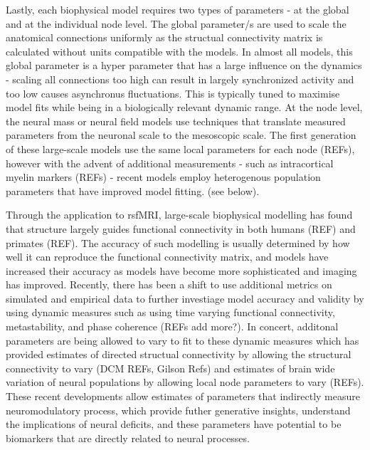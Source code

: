 \documentclass[oneside]{zHenriquesLab-StyleBioRxiv}
\begin{document}
Lastly, each biophysical model requires two types of parameters - at the global and at the individual node level. The global parameter/s are used to scale the anatomical connections uniformly as the structual connectivity matrix is calculated without units compatible with the models. In almost all models, this global parameter is a hyper parameter that has a large influence on the dynamics - scaling all connections too high can result in largely synchronized activity and too low causes asynchronus fluctuations. This is typically tuned to maximise model fits while being in a biologically relevant dynamic range. At the node level, the neural mass or neural field models use techniques that translate measured parameters from the neuronal scale to the mesoscopic scale. The first generation of these large-scale models use the same local parameters for each node (REFs), however with the advent of additional measurements - such as intracortical myelin markers (REFs) - recent models employ heterogenous population parameters that have improved model fitting. (see below).


Through the application to rsfMRI, large-scale biophysical modelling has found that structure largely guides functional connectivity in both humans (REF) and primates (REF). The accuracy of such modelling is usually determined by how well it can reproduce the functional connectivity matrix, and models have increased their accuracy as models have become more sophisticated and imaging has improved. Recently, there has been a shift to use additional metrics on simulated and empirical data to further investiage model accuracy and validity by using dynamic measures such as using time varying functional connectivity, metastability, and phase coherence (REFs add more?). In concert, additonal parameters are being allowed to vary to fit to these dynamic measures which has provided estimates of directed structual connectivity by allowing the structural connectivity to vary (DCM REFs, Gilson Refs) and estimates of brain wide variation of neural populations by allowing local node parameters to vary (REFs). These recent developments allow estimates of parameters that indirectly measure neuromodulatory process, which provide futher generative insights, understand the implications of neural deficits, and these parameters have potential to be biomarkers that are directly related to neural processes. 




\end{document}
